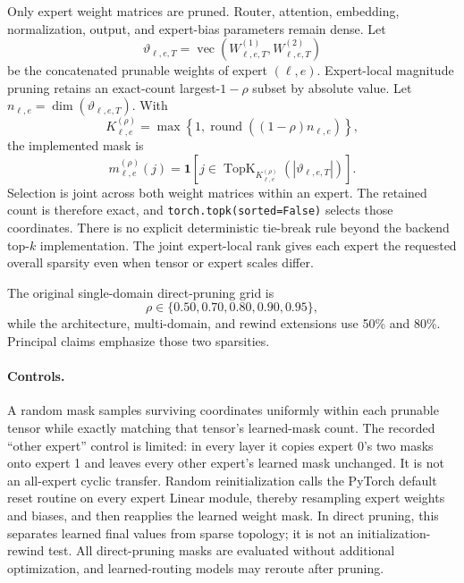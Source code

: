 \documentclass{article}
\begin{document}
Only expert weight matrices are pruned. Router, attention, embedding,
normalization, output, and expert-bias parameters remain dense. Let
\begin{equation}
\vartheta_{\ell,e,T}
=
\operatorname{vec}
\left(
W_{\ell,e,T}^{(1)},W_{\ell,e,T}^{(2)}
\right)
\label{eq:app_vectorized_expert}
\end{equation}
be the concatenated prunable weights of expert $(\ell,e)$. Expert-local
magnitude pruning retains an exact-count largest-$1-\rho$ subset by absolute
value. Let $n_{\ell,e}=\dim(\vartheta_{\ell,e,T})$. With
\begin{equation}
K_{\ell,e}^{(\rho)}
=
\max\!\left\{1,\operatorname{round}\!\left((1-\rho)n_{\ell,e}\right)\right\},
\end{equation}
the implemented mask is
\begin{equation}
m_{\ell,e}^{(\rho)}(j)
=
\mathbf{1}\!\left[
j\in\operatorname{TopK}_{K_{\ell,e}^{(\rho)}}
\!\left(|\vartheta_{\ell,e,T}|\right)
\right].
\label{eq:app_mask_threshold}
\end{equation}
Selection is joint across both weight matrices within an expert. The retained
count is therefore exact, and \texttt{torch.topk(sorted=False)} selects those
coordinates. There is no
explicit deterministic tie-break rule beyond the backend top-$k$
implementation. The joint expert-local rank gives each expert the requested
overall sparsity even when tensor or expert scales differ.

The original single-domain direct-pruning grid is
\begin{equation}
\rho\in\{0.50,0.70,0.80,0.90,0.95\},
\label{eq:app_sparsity_grid}
\end{equation}
while the architecture, multi-domain, and rewind extensions use 50\% and 80\%.
Principal claims emphasize those two sparsities.

\paragraph{Controls.}
A random mask samples surviving coordinates uniformly within each prunable
tensor while exactly matching that tensor's learned-mask count. The recorded
``other expert'' control is limited: in every layer it copies expert 0's two
masks onto expert 1 and leaves every other expert's learned mask unchanged. It
is not an all-expert cyclic transfer. Random reinitialization calls the PyTorch
default reset routine on every expert Linear module, thereby resampling expert
weights and biases, and then reapplies the learned weight mask. In direct
pruning, this separates learned final values from sparse topology; it is not an
initialization-rewind test. All direct-pruning masks are evaluated without
additional optimization, and learned-routing models may reroute after pruning.
\end{document}
